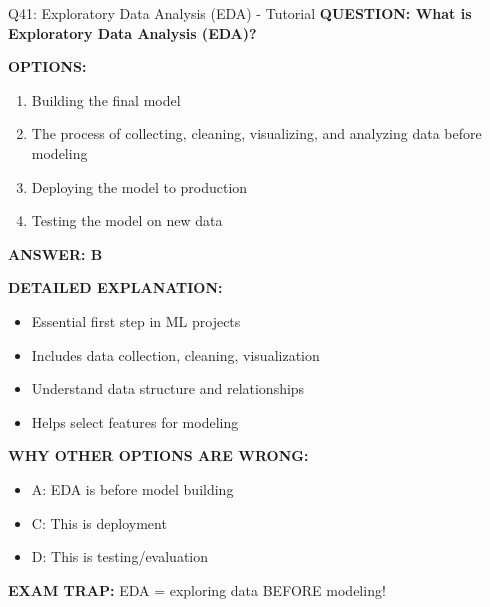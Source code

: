 \documentclass[8pt]{beamer}
\begin{document}
	\begin{frame}{Q41: Exploratory Data Analysis (EDA) - Tutorial}
		\fontsize{6.5}{7.5}\selectfont
		\textbf{QUESTION: What is Exploratory Data Analysis (EDA)?}
		
		\vspace{0.1cm}
		\textbf{OPTIONS:}
		\begin{enumerate}
			\item Building the final model
			\item The process of collecting, cleaning, visualizing, and analyzing data before modeling
			\item Deploying the model to production
			\item Testing the model on new data
		\end{enumerate}
		
		\vspace{0.1cm}
		\textcolor{myblue}{\textbf{ANSWER: B}}
		
		\vspace{0.1cm}
		\textbf{DETAILED EXPLANATION:}
		\begin{itemize}
			\item Essential first step in ML projects
			\item Includes data collection, cleaning, visualization
			\item Understand data structure and relationships
			\item Helps select features for modeling
		\end{itemize}
		
		\vspace{0.1cm}
		\textcolor{myred}{\textbf{WHY OTHER OPTIONS ARE WRONG:}}
		\begin{itemize}
			\item \textcolor{myred}{A:} EDA is before model building
			\item \textcolor{myred}{C:} This is deployment
			\item \textcolor{myred}{D:} This is testing/evaluation
		\end{itemize}
		
		\textcolor{myred}{\textbf{EXAM TRAP:}} EDA = \textcolor{myblue}{exploring data BEFORE modeling}!
	\end{frame}
	
\end{document}
